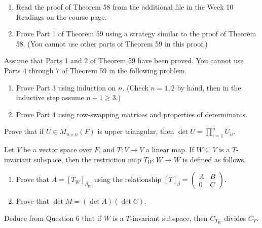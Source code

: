 \documentclass{eh-homework}
\begin{document}
    \begin{question}{3}
    \begin{enumerate}
        \item Read the proof of Theorem 58 from the additional file in the Week 10 Readings on the course page.
        \item Prove Part 1 of Theorem 59 using a strategy similar to the proof of Theorem 58. (You cannot use other parts of Theorem 59 in this proof.)
    \end{enumerate}
    \end{question}
    
    \begin{question}{4}
    Assume that Parts 1 and 2 of Theorem 59 have been proved. You cannot use Parts 4 through 7 of Theorem 59 in the following problem.
    
    \begin{enumerate}
        \item Prove Part 3 using induction on $n$. (Check $n = 1, 2$ by hand, then in the inductive step assume $n+1 \ge 3$.)
        \item Prove Part 4 using row-swapping matrices and properties of determinants.
    \end{enumerate}
    \end{question}
    
    \begin{question}{5}
    Prove that if $U \in M_{n \times n}(F)$ is upper triangular, then $\det U = \prod_{i=1}^n U_{ii}$.
    \end{question}
    
    \begin{question}{6}
    Let $V$ be a vector space over $F$, and $T : V \to V$ a linear map. If $W \subseteq V$ is a $T$-invariant subspace, then the restriction map $T_W : W \to W$ is defined as follows.
    
    \begin{enumerate}
        \item Prove that $A = [T_W]_{\beta_W}$ using the relationship $[T]_\beta = \begin{pmatrix} A & B \\ 0 & C \end{pmatrix}$.
        \item Prove that $\det M = (\det A)(\det C)$.
    \end{enumerate}
    \end{question}
    
    \begin{question}{7}
    Deduce from Question 6 that if $W$ is a $T$-invariant subspace, then $C_{T_W}$ divides $C_T$.
    \end{question}
    
\end{document}
